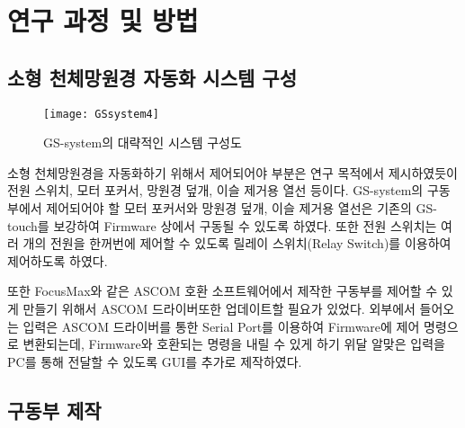 
\section{연구 과정 및 방법}


\subsection{소형 천체망원경 자동화 시스템 구성}




\begin{figure}[h]
	\begin{center}
		\texttt{[image: GSsystem4]}
	\end{center}
	\caption{GS-system의 대략적인 시스템 구성도}
	\label{GSsystem}
\end{figure}

소형 천체망원경을 자동화하기 위해서 제어되어야 부분은 연구 목적에서 제시하였듯이 전원 스위치, 모터 포커서, 망원경 덮개, 이슬 제거용 열선 등이다. GS-system의 구동부에서 제어되어야 할 모터 포커서와 망원경 덮개, 이슬 제거용 열선은 기존의 GS-touch를 보강하여 Firmware 상에서 구동될 수 있도록 하였다. 또한 전원 스위치는 여러 개의 전원을 한꺼번에 제어할 수 있도록 릴레이 스위치(Relay Switch)를 이용하여 제어하도록 하였다. 

또한 FocusMax와 같은 ASCOM 호환 소프트웨어에서 제작한 구동부를 제어할 수 있게 만들기 위해서 ASCOM 드라이버또한 업데이트할 필요가 있었다. 외부에서 들어오는 입력은 ASCOM 드라이버를 통한 Serial Port를 이용하여 Firmware에 제어 명령으로 변환되는데, Firmware와 호환되는 명령을 내릴 수 있게 하기 위달 알맞은 입력을 PC를 통해 전달할 수 있도록 GUI를 추가로 제작하였다.



\subsection{구동부 제작}

